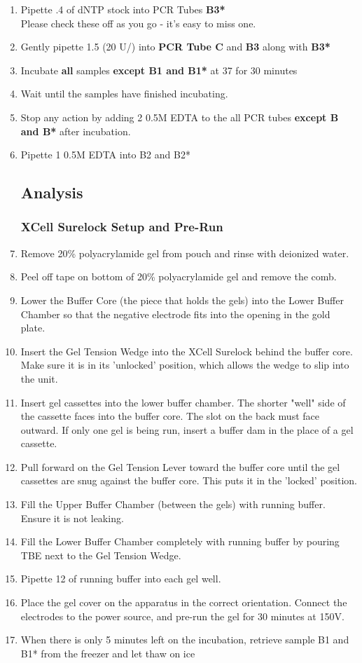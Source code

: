 \documentclass{ssiBio}
\begin{document}
\begin{enumerate}
\item{Pipette .4\uL{} of dNTP stock into PCR Tubes \textbf{B3*}}\\
	Please check these off as you go - it's easy to miss one.
\item{Gently pipette 1.5\uL{} \tdt{} (20 U/\uL{}) into \textbf{PCR Tube C} and \textbf{B3} along with \textbf{B3*}}
\item{Incubate \textbf{all} samples \textbf{except B1 and B1*} at 37\C{} for 30 minutes}
\item{Wait until the samples have finished incubating.}
\item{Stop any \tdt action by adding 2\uL{} 0.5M EDTA to the all PCR tubes \textbf{except B and B*} after incubation.\cite{Invitrogen2002}}
\item{Pipette 1\uL{} 0.5M EDTA into B2 and B2*}

\RstopPoint{} 
\subsection{Analysis}
\subsubsection{XCell Surelock Setup and Pre-Run}
\item{Remove 20\% polyacrylamide gel from pouch and rinse with deionized water.}
\item{Peel off tape on bottom of 20\% polyacrylamide gel and remove the comb.}
\item{Lower the Buffer Core (the piece that holds the gels) into the Lower Buffer Chamber so that the negative electrode fits into the opening in the gold plate.}
\item{Insert the Gel Tension Wedge into the XCell Surelock behind the buffer core. Make sure it is in its 'unlocked' position, which allows the wedge to slip into the unit.}
\item{Insert gel cassettes into the lower buffer chamber. The shorter "well" side of the cassette faces into the buffer core. The slot on the back must face outward. If only one gel is being run, insert a buffer dam in the place of a gel cassette.}
\item{Pull forward on the Gel Tension Lever toward the buffer core until the gel cassettes are snug against the buffer core. This puts it in the 'locked' position.}
\item{Fill the Upper Buffer Chamber (between the gels) with running buffer. Ensure it is not leaking.}
\item{Fill the Lower Buffer Chamber completely with running buffer by pouring TBE next to the Gel Tension Wedge.}
\item{Pipette 12\uL{} of running buffer into each gel well.}
\item{Place the gel cover on the apparatus in the correct orientation. Connect the electrodes to the power source, and pre-run the gel for 30 minutes at 150V.}
\item{When there is only 5 minutes left on the incubation, retrieve sample B1 and B1* from the freezer and let thaw on ice}

\end{enumerate}
\end{document}

